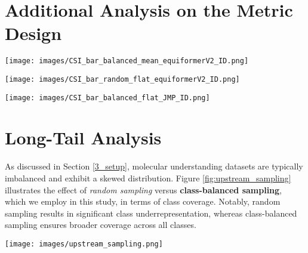 \section{Additional Analysis on the Metric Design}

\begin{figure*}[h]
\centering
\texttt{[image: images/CSI\_bar\_balanced\_mean\_equiformerV2\_ID.png]}
\caption{\textbf{Impact of using mean aggregation instead of flattening on CSI values.} We notice that the mean pooling incorrectly reduced the score for OC22 potentially due to over-smoothing.} 
\vspace{-0.4cm}
\label{fig:CSI_mean}
\end{figure*}


\begin{figure*}[h]
\centering
\texttt{[image: images/CSI\_bar\_random\_flat\_equiformerV2\_ID.png]}
\caption{\textbf{Impact of using random sampling strategy instead of class-balanced sampling.} As highlighted in the long-tail analysis in Appendix \ref{long_tail}, random sampling can lead to class underrepresentation, potentially affecting the correlation between upstream and downstream tasks. Notably, both ANI-1x and Transition-1x exhibit different patterns compared to the class-balanced values reported in the main paper.}
\vspace{-0.4cm}
\label{fig:CSI_random}
\end{figure*}

\begin{figure*}[h]
\centering
\texttt{[image: images/CSI\_bar\_balanced\_flat\_JMP\_ID.png]}
\caption{\textbf{The impact of using another backbone}. We use JMP pretrained model and show that similar insights are obtained where Ani-1x is shown as the most similar.} 
\vspace{-0.4cm}
\label{fig:CSI_JMP}
\end{figure*}

\clearpage

\section{Long-Tail Analysis}
\label{long_tail}
As discussed in Section \ref{3_setup}, molecular understanding datasets are typically imbalanced and exhibit a skewed distribution. Figure \ref{fig:upstream_sampling} illustrates the effect of \textit{random sampling} versus \textbf{class-balanced sampling}, which we employ in this study, in terms of class coverage. Notably, random sampling results in significant class underrepresentation, whereas class-balanced sampling ensures broader coverage across all classes.

\begin{figure*}[h]
\centering
\texttt{[image: images/upstream\_sampling.png]}
\caption{\textbf{Impact of sampling strategies on subset construction for feature extraction.} We sample 10K instances for each upstream task, highlighting the differences in class coverage between random and class-balanced sampling.} 
\label{fig:upstream_sampling}
\end{figure*}




\clearpage